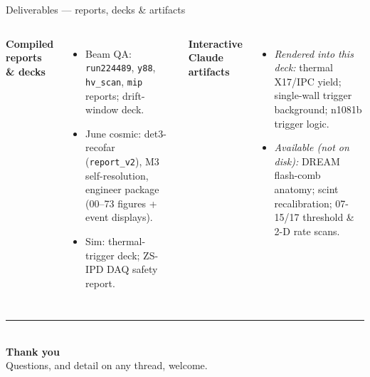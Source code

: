 \documentclass[aspectratio=169,10pt]{beamer}
\begin{document}
\begin{frame}{Deliverables --- reports, decks \& artifacts}
\small
\begin{columns}[T]
\textbf{\color{TealD}Compiled reports \& decks}
\begin{itemize}\setlength\itemsep{1pt}
  \item Beam QA: \texttt{run224489}, \texttt{y88}, \texttt{hv\_scan}, \texttt{mip} reports; drift-window deck.
  \item June cosmic: det3-recofar (\texttt{report\_v2}), M3 self-resolution, engineer package (00--73 figures + event displays).
  \item Sim: thermal-trigger deck; ZS-IPD DAQ safety report.
\end{itemize}
\textbf{\color{TealD}Interactive Claude artifacts}
\begin{itemize}\setlength\itemsep{1pt}
  \item \emph{Rendered into this deck:} thermal X17/IPC yield; single-wall trigger background; n1081b trigger logic.
  \item \emph{Available (not on disk):} DREAM flash-comb anatomy; scint recalibration; 07-15/17 threshold \& 2-D rate scans.
\end{itemize}
\end{columns}
\vspace{1.2em}
\end{frame}

{
\begin{frame}[plain]
  \vfill\centering
  {\color{Teal}\rule{0.14\textwidth}{2pt}}\\[1.2ex]
  {\Large\color{TealD}\textbf{Thank you}}\\[0.6ex]
  {\color{SlateL}\small Questions, and detail on any thread, welcome.}
  \vfill
\end{frame}}
\end{document}
